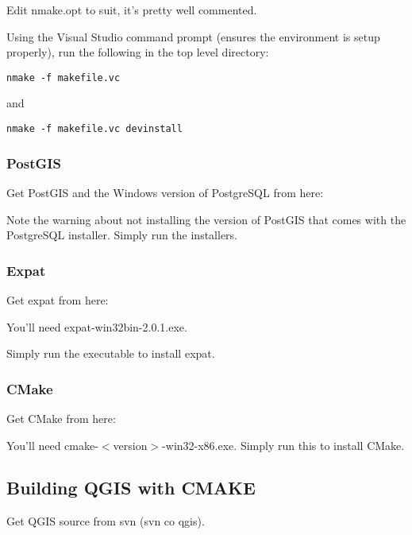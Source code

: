 Edit nmake.opt to suit, it's pretty well commented.

Using the Visual Studio command prompt (ensures the environment is setup properly), run the following in the top level directory:

\begin{verbatim}
nmake -f makefile.vc 
\end{verbatim}

and

\begin{verbatim}
nmake -f makefile.vc devinstall 
\end{verbatim}

\subsubsection{PostGIS}
Get PostGIS and the Windows version of PostgreSQL from here:

	\begin{quotation}
	\end{quotation}
Note the warning about not installing the version of PostGIS that comes with the PostgreSQL installer. Simply run the installers.

\subsubsection{Expat}
Get expat from here:

	\begin{quotation}
	\end{quotation}
You'll need expat-win32bin-2.0.1.exe.

Simply run the executable to install expat.

\subsubsection{CMake}
Get CMake from here:

	\begin{quotation}
	\end{quotation}
You'll need cmake-$<$version$>$-win32-x86.exe. Simply run this to install CMake.

\subsection{Building QGIS with CMAKE}
Get QGIS source from svn (svn co  qgis).

